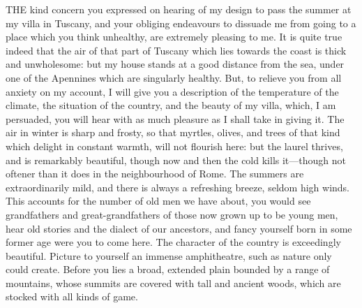 
THE kind concern you expressed on hearing of my design to pass the summer
at my villa in Tuscany, and your obliging endeavours to dissuade me from
going to a place which you think unhealthy, are extremely pleasing to me.
It is quite true indeed that the air of that part of Tuscany which lies
towards the coast is thick and unwholesome: but my house stands at a good
distance from the sea, under one of the Apennines which are singularly
healthy. But, to relieve you from all anxiety on my account, I will give
you a description of the temperature of the climate, the situation of the
country, and the beauty of my villa, which, I am persuaded, you will hear
with as much pleasure as I shall take in giving it. The air in winter is
sharp and frosty, so that myrtles, olives, and trees of that kind which
delight in constant warmth, will not flourish here: but the laurel
thrives, and is remarkably beautiful, though now and then the cold kills
it—though not oftener than it does in the neighbourhood of Rome. The
summers are extraordinarily mild, and there is always a refreshing breeze,
seldom high winds. This accounts for the number of old men we have about,
you would see grandfathers and great-grandfathers of those now grown up to
be young men, hear old stories and the dialect of our ancestors, and fancy
yourself born in some former age were you to come here. The character of
the country is exceedingly beautiful. Picture to yourself an immense
amphitheatre, such as nature only could create. Before you lies a broad,
extended plain bounded by a range of mountains, whose summits are covered
with tall and ancient woods, which are stocked with all kinds of game.

